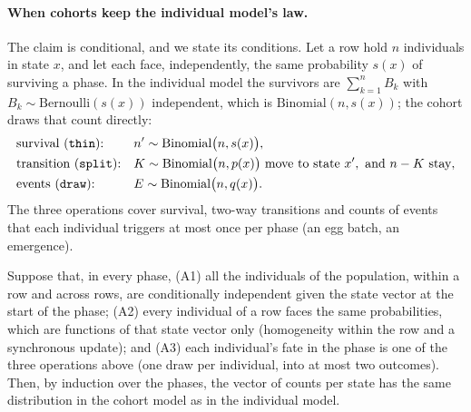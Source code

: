 \paragraph{When cohorts keep the individual model's law.} The claim is conditional, and
we state its conditions. Let a row hold $n$ individuals in state $x$, and let each face,
independently, the same probability $s(x)$ of surviving a phase. In the individual model
the survivors are $\sum_{k=1}^{n} B_k$ with $B_k \sim \mathrm{Bernoulli}(s(x))$
independent, which is $\mathrm{Binomial}(n, s(x))$; the cohort draws that count directly:
\begin{equation}
  \begin{aligned}
    &\text{survival (\texttt{thin}):} && n' \sim \mathrm{Binomial}\bigl(n, s(x)\bigr),\\
    &\text{transition (\texttt{split}):} && K \sim \mathrm{Binomial}\bigl(n, p(x)\bigr)
      \text{ move to state } x', \text{ and } n - K \text{ stay},\\
    &\text{events (\texttt{draw}):} && E \sim \mathrm{Binomial}\bigl(n, q(x)\bigr).
  \end{aligned}
  \label{eq:cohorts}
\end{equation}
The three operations cover survival, two-way transitions and counts of events that each
individual triggers at most once per phase (an egg batch, an emergence).

\begin{description}[style=nextline,leftmargin=1.5em,itemsep=2pt]
  \item[Proposition.] Suppose that, in every phase, (A1) all the individuals of the
  population, within a row and across rows, are conditionally independent given the state
  vector at the start of the phase; (A2) every individual of a row faces the same
  probabilities, which are functions of that state vector only (homogeneity within the row
  and a synchronous update); and (A3) each individual's fate in the phase is one of the
  three operations above (one draw per individual, into at most two outcomes). Then, by
  induction over the phases, the vector of counts per state has the same distribution in
  the cohort model as in the individual model.
\end{description}

